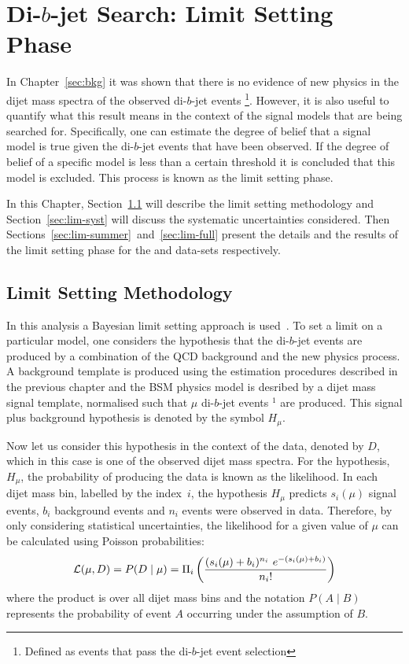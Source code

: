 \chapter{Di-$b$-jet Search: Limit Setting Phase}
\label{sec:lim}

In Chapter~\ref{sec:bkg} it was shown that there is no evidence of new physics in the dijet mass spectra of the observed di-$b$-jet events
\footnote{Defined as events that pass the di-$b$-jet event selection}. %
However, it is also useful to quantify what this result means in the context
of the signal models that are being searched for.
Specifically, one can estimate the degree of belief that a signal model is true given the di-$b$-jet events that have been observed.
If the degree of belief of a specific model is less than a certain threshold it is concluded that this model is excluded.
This process is known as the limit setting phase.

In this Chapter,
Section~\ref{sec:lim-strat} will describe the limit setting methodology and
Section~\ref{sec:lim-syst} will discuss the systematic uncertainties considered.
Then Sections~\ref{sec:lim-summer}~and~\ref{sec:lim-full} present the details and
the results of the limit setting phase for the \summer{} and \lm{} data-sets respectively.

\section{Limit Setting Methodology}
\label{sec:lim-strat}

In this analysis a Bayesian limit setting approach is used~\cite{lim-bayes}.
To set a limit on a particular model, one considers the hypothesis that the di-$b$-jet events
are produced by a combination of the QCD background and the new physics process.
A background template is produced using the estimation procedures described in the previous chapter
and the BSM physics model is desribed by a dijet mass signal template, normalised such that $\mu$  di-$b$-jet events $^{1}$ are produced.  %
This signal plus background hypothesis is denoted by the symbol $H_\mu$.

Now let us consider this hypothesis in the context of the data, denoted by $D$,
which in this case is one of the observed dijet mass spectra.
For the hypothesis, $H_\mu$, the probability of producing the data is known as the likelihood.
In each dijet mass bin, labelled by the index~$i$, the hypothesis $H_\mu$ predicts
$s_i(\mu)$ signal events, $b_i$ background events and $n_i$ events were observed in data.
Therefore, by only considering statistical uncertainties, the likelihood for a given value of $\mu$ can be calculated using Poisson probabilities:
\begin{equation}
  \mathcal{L} (\mu,D) = P(D \mid \mu) =  \Pi_i \left(\frac{(s_i(\mu)+b_i)^{n_i}~e^{-(s_i(\mu)+b_i)}}{n_i!}\right)
  \label{eqn:lim-like}
\end{equation}
where the product is over all dijet mass bins and
the notation $P(A \mid B)$ represents the probability of event $A$ occurring
under the assumption of $B$.

